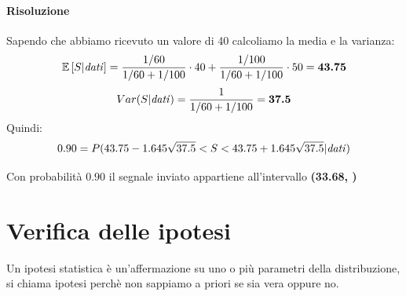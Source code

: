 \documentclass[]{article}
\newcommand{\ev}{\mathbb{E}[X]}
\renewcommand{\ev}[1]{\mathbb{E}\left[#1\right]}
\begin{document}
    \paragraph{Risoluzione} Sapendo che abbiamo ricevuto un valore di 40 calcoliamo la media e la varianza:
    \[ \ev{S | \text{\textit{dati}}} = \frac{1 / 60}{1 / 60 + 1/100} \cdot 40 + \frac{1 / 100}{1 / 60 + 1/100} \cdot 50 = \boldsymbol{43.75} \]
    \[ Var(S | \text{\textit{dati}}) = \frac{1}{1/60 + 1/100} = \boldsymbol{37.5} \]
    Quindi:
    \[ 0.90 = P(43.75 - 1.645 \sqrt{37.5} < S < 43.75 + 1.645 \sqrt{37.5} | \text{\textit{dati}}) \]
    \centerline{Con probabilità $0.90$ il segnale inviato appartiene all'intervallo \textbf{(33.68, )}}
    \newpage
    \section{Verifica delle ipotesi}
    Un ipotesi statistica è un'affermazione su uno o più parametri della distribuzione, si chiama ipotesi perchè non sappiamo a priori se sia vera oppure no.
\end{document}
